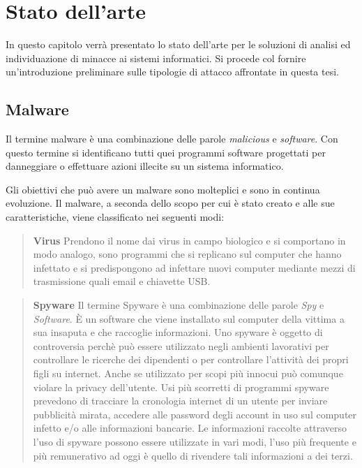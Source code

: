 \documentclass[../main.tex]{subfiles}
\begin{document}
\chapter{Stato dell'arte}

In questo capitolo verrà presentato lo stato dell'arte per le soluzioni di analisi ed individuazione di minacce ai sistemi informatici. Si procede col fornire un'introduzione preliminare sulle tipologie di attacco affrontate in questa tesi.

\section{Malware}
Il termine malware è una combinazione delle parole \textit{malicious} e \textit{software}. Con questo termine si identificano tutti quei programmi software progettati per danneggiare o effettuare azioni illecite su un sistema informatico. \cite{MalwareDef}

Gli obiettivi che può avere un malware sono molteplici e sono in continua evoluzione. Il malware, a seconda dello scopo per cui è stato creato e alle sue caratteristiche, viene classificato nei seguenti modi:

\begin{verse}
				\textbf{Virus} Prendono il nome dai virus in campo biologico e si comportano in modo analogo, sono programmi che si replicano sul computer che hanno infettato e si predispongono ad infettare nuovi computer mediante mezzi di trasmissione quali email e chiavette USB. \cite{VirusDef}
\end{verse}

\begin{verse}
				\textbf{Spyware} Il termine Spyware è una combinazione delle parole \textit{Spy} e \textit{Software}. È un software che viene installato sul computer della vittima a sua insaputa e che raccoglie informazioni. 
				Uno spyware è oggetto di controversia perchè può essere utilizzato negli ambienti lavorativi per controllare le ricerche dei dipendenti o per controllare l'attività dei propri figli su internet. Anche se utilizzato per scopi più innocui può comunque violare la privacy dell'utente. \cite{Spyware2} \newline
				Usi più scorretti di programmi spyware prevedono di tracciare la cronologia internet di un utente per inviare pubblicità mirata, accedere alle password degli account in uso sul computer infetto e/o alle informazioni bancarie. Le informazioni raccolte attraverso l'uso di spyware possono essere utilizzate in vari modi, l'uso più frequente e più remunerativo ad oggi è quello di rivendere tali informazioni a dei terzi. \cite{Spyware1}
\end{verse}
\end{document}
